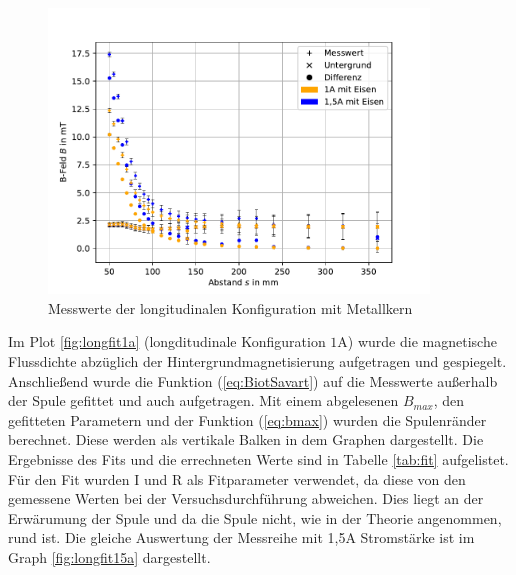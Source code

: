 \documentclass[11pt, a4paper]{article}
\begin{document}
    \begin{figure}[h]
        \centering
        \includegraphics[width=0.9\textwidth]{mitKernRaw.pdf}
        \caption{Messwerte der longitudinalen Konfiguration mit Metallkern}
        \label{fig:longmessmitKern}
    \end{figure}


    Im Plot \ref{fig:longfit1a} (longditudinale Konfiguration $1 \si{\ampere}$) wurde die magnetische Flussdichte abzüglich der Hintergrundmagnetisierung aufgetragen und gespiegelt. Anschließend wurde die Funktion (\ref{eq:BiotSavart}) auf die Messwerte außerhalb der Spule gefittet und auch aufgetragen. Mit einem abgelesenen $B_{max}$,  den gefitteten Parametern und der Funktion (\ref{eq:bmax}) wurden die Spulenränder berechnet. Diese werden als vertikale Balken in dem Graphen dargestellt. 
    Die Ergebnisse des Fits und die errechneten Werte sind in Tabelle \ref{tab:fit} aufgelistet. Für den Fit wurden I und R als Fitparameter verwendet, da diese von den gemessene Werten bei der Versuchsdurchführung abweichen. Dies liegt an der Erwärumung der Spule und da die Spule nicht, wie in der Theorie angenommen, rund ist.
    Die gleiche Auswertung der Messreihe mit 1,5A Stromstärke ist im Graph \ref{fig:longfit15a} dargestellt.
    
\end{document}
